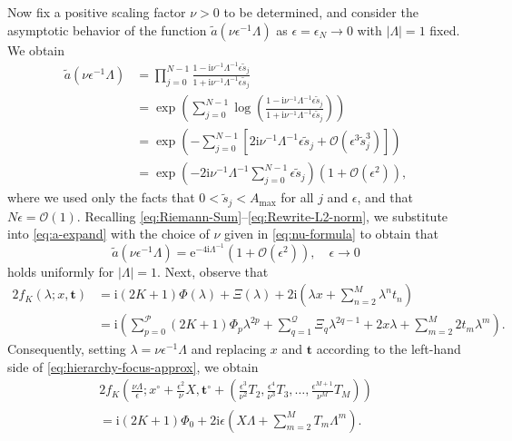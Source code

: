 \documentclass[12pt]{amsart}
\numberwithin{equation}{section}
\newcommand{\ee}{\mathrm{e}}
\newcommand{\ii}{\mathrm{i}}
\newcommand{\SP}{\lambda}
\newcommand{\phaseint}{\Phi}
\newcommand{\tailint}{\Xi}
\newcommand{\eps}{\epsilon}
\newcommand{\bigo}[1]{ \mathcal{O}\! \left( #1 \right) }
\begin{document}
Now fix a positive scaling factor $\nu>0$ to be determined, and consider the asymptotic behavior of the function $\widetilde{a}(\nu\epsilon^{-1}\Lambda)$ as $\epsilon=\epsilon_N\to 0$ with $|\Lambda|=1$ fixed.  We obtain
\begin{equation}
\begin{split}
\widetilde{a}(\nu\epsilon^{-1}\Lambda)&=\prod_{j=0}^{N-1}\frac{1-\ii\nu^{-1}\Lambda^{-1}\epsilon\widetilde{s}_j}{1+\ii\nu^{-1}\Lambda^{-1}\epsilon \widetilde{s}_j}\\
&=\exp\left(\sum_{j=0}^{N-1}\log\left(\frac{1-\ii\nu^{-1}\Lambda^{-1}\epsilon\widetilde{s}_j}{1+\ii\nu^{-1}\Lambda^{-1}\epsilon \widetilde{s}_j}\right)\right)\\
&=\exp\left(-\sum_{j=0}^{N-1}\left[2\ii\nu^{-1}\Lambda^{-1}\epsilon\widetilde{s}_j+\mathcal{O}(\epsilon^3\widetilde{s}_j^3)\right]\right)\\
&=\exp\left(-2\ii\nu^{-1}\Lambda^{-1}\sum_{j=0}^{N-1}\epsilon\widetilde{s}_j\right)(1+\mathcal{O}(\epsilon^2)),
\end{split}
\label{eq:a-expand}
\end{equation}
where we used only the facts that $0<\widetilde{s}_j<A_\mathrm{max}$ for all $j$ and $\epsilon$, and that $N\epsilon=\mathcal{O}(1)$.  Recalling \eqref{eq:Riemann-Sum}--\eqref{eq:Rewrite-L2-norm}, we substitute into \eqref{eq:a-expand} with the choice of $\nu$ given in \eqref{eq:nu-formula}
to obtain that 
\begin{equation}
\widetilde{a}(\nu\epsilon^{-1}\Lambda)=\ee^{-4\ii\Lambda^{-1}}\left(1+ \bigo{\eps^2} \right), 
\quad\epsilon\to 0
\end{equation}
holds uniformly for $|\Lambda|=1$.  
Next, observe that
\begin{equation}
\begin{split}
2f_K(\SP;x,\mathbf{t})&=\ii (2K+1)\phaseint(\SP)+\tailint(\SP) + 2\ii\left(\SP x + \sum_{n=2}^M\SP^nt_n\right)\\
&=\ii\left(\sum_{p=0}^{\mathcal{P}}(2K+1)\phaseint_p\SP^{2p} +\sum_{q=1}^{\mathcal{Q}}\tailint_q\SP^{2q-1} + 2 x\SP +\sum_{m=2}^M2t_m\SP^m\right).
\end{split}
\end{equation}
Consequently, setting $\SP=\nu\eps^{-1}\Lambda$ and replacing $x$ and $\mathbf{t}$ according to the left-hand side of \eqref{eq:hierarchy-focus-approx}, we obtain
\begin{multline}
2f_K\left(\frac{\nu\Lambda}{\eps};x^\circ+\frac{\eps^2}{\nu}X,\mathbf{t}^\circ+\left(\frac{\eps^3}{\nu^2}T_2,\frac{\eps^4}{\nu^3}T_3,\dots,\frac{\eps^{M+1}}{\nu^M}T_M\right)\right)\\{}=
\ii(2K+1)\phaseint_0
+2\ii\eps\left(X\Lambda+\sum_{m=2}^MT_m\Lambda^m\right).
\label{eq:exponent-expand}
\end{multline}
\end{document}
